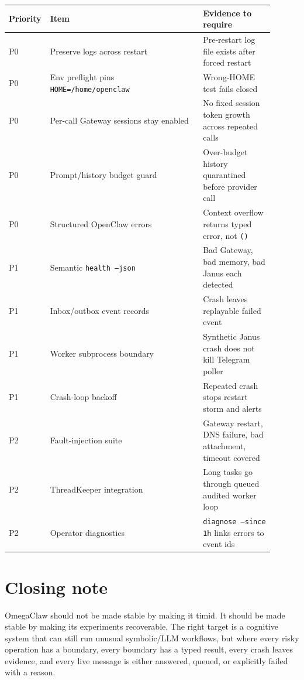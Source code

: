 \documentclass[11pt]{article}
\begin{document}
\begin{longtable}{p{0.08\linewidth} p{0.56\linewidth} p{0.26\linewidth}}
\toprule
Priority & Item & Evidence to require \\
\midrule
P0 & Preserve logs across restart & Pre-restart log file exists after forced restart \\
P0 & Env preflight pins \texttt{HOME=/home/openclaw} & Wrong-HOME test fails closed \\
P0 & Per-call Gateway sessions stay enabled & No fixed session token growth across repeated calls \\
P0 & Prompt/history budget guard & Over-budget history quarantined before provider call \\
P0 & Structured OpenClaw errors & Context overflow returns typed error, not \texttt{()} \\
P1 & Semantic \texttt{health --json} & Bad Gateway, bad memory, bad Janus each detected \\
P1 & Inbox/outbox event records & Crash leaves replayable failed event \\
P1 & Worker subprocess boundary & Synthetic Janus crash does not kill Telegram poller \\
P1 & Crash-loop backoff & Repeated crash stops restart storm and alerts \\
P2 & Fault-injection suite & Gateway restart, DNS failure, bad attachment, timeout covered \\
P2 & ThreadKeeper integration & Long tasks go through queued audited worker loop \\
P2 & Operator diagnostics & \texttt{diagnose --since 1h} links errors to event ids \\
\bottomrule
\end{longtable}

\section{Closing note}

OmegaClaw should not be made stable by making it timid. It should be made stable by making its experiments recoverable. The right target is a cognitive system that can still run unusual symbolic/LLM workflows, but where every risky operation has a boundary, every boundary has a typed result, every crash leaves evidence, and every live message is either answered, queued, or explicitly failed with a reason.
\end{document}
